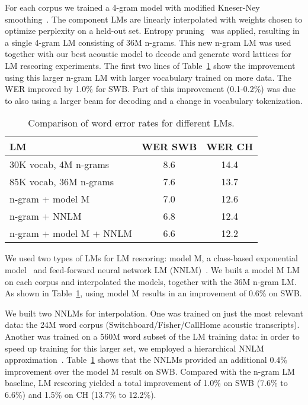 \documentclass[a4paper]{article}
\begin{document}
For each corpus we trained a 4-gram model with modified Kneser-Ney
smoothing~\cite{chen99}.  The component LMs are linearly interpolated
with weights chosen to optimize perplexity on a held-out set.  Entropy
pruning~\cite{stolcke98} was applied, resulting in a single 4-gram LM
consisting of 36M n-grams.  This new n-gram LM was used together with
our best acoustic model to decode and generate word lattices for LM
rescoring experiments.  The first two lines of Table~\ref{lm-tab} show
the improvement using this larger n-gram LM with larger vocabulary
trained on more data.  The WER improved by 1.0\% for SWB.  Part of
this improvement (0.1-0.2\%) was due to also using a larger beam for
decoding and a change in vocabulary tokenization.

\begin{table}[htpb!]
\begin{center}
\begin{tabular}{|l|c|c|} \hline
LM                                 & WER SWB & WER CH \\ \hline 
30K vocab, 4M n-grams              & 8.6     & 14.4   \\ \hline 
85K vocab, 36M n-grams             & 7.6     & 13.7   \\ \hline
n-gram + model M                   & 7.0     & 12.6   \\ \hline
n-gram + NNLM                      & 6.8     & 12.4   \\ \hline
n-gram + model M + NNLM            & 6.6     & 12.2   \\ \hline 
\end{tabular}
\end{center}
\caption{\label{lm-tab}
Comparison of word error rates for different LMs.}
\end{table}

We used two types of LMs for LM rescoring: model M, a class-based
exponential model~\cite{chen09} and feed-forward neural network LM
(NNLM)~\cite{Bengio03,Emami06,Schwenk07,emamiasru07}.  We built a
model M LM on each corpus and interpolated the models, together with
the 36M n-gram LM.  As shown in Table~\ref{lm-tab}, using model M
results in an improvement of 0.6\% on SWB.

We built two NNLMs for interpolation. One was trained on just the most
relevant data: the 24M word corpus (Switchboard/Fisher/CallHome
acoustic transcripts).  Another was trained on a 560M word subset of
the LM training data: in order to speed up training for this larger
set, we employed a hierarchical NNLM
approximation~\cite{Emami06,kuo2012large}.  Table~\ref{lm-tab} shows
that the NNLMs provided an additional 0.4\% improvement over the model
M result on SWB. Compared with the n-gram LM baseline, LM rescoring
yielded a total improvement of 1.0\% on SWB (7.6\% to 6.6\%) and 1.5\%
on CH (13.7\% to 12.2\%).
\end{document}
